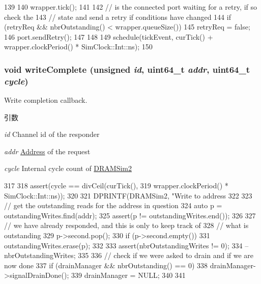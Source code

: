 \begin{DoxyCode}
139 {
140     wrapper.tick();
141 
142     // is the connected port waiting for a retry, if so check the
143     // state and send a retry if conditions have changed
144     if (retryReq && nbrOutstanding() < wrapper.queueSize()) {
145         retryReq = false;
146         port.sendRetry();
147     }
148 
149     schedule(tickEvent, curTick() + wrapper.clockPeriod() * SimClock::Int::ns);
150 }
\end{DoxyCode}
\hypertarget{classDRAMSim2_aeb50ab991dbcebefc4952362893d0891}{
\subsubsection[{writeComplete}]{\setlength{\rightskip}{0pt plus 5cm}void writeComplete (unsigned {\em id}, \/  uint64\_\-t {\em addr}, \/  uint64\_\-t {\em cycle})}}
\label{classDRAMSim2_aeb50ab991dbcebefc4952362893d0891}
Write completion callback.


\begin{DoxyParams}{引数}
\item[{\em id}]Channel id of the responder \item[{\em addr}]\hyperlink{classAddress}{Address} of the request \item[{\em cycle}]Internal cycle count of \hyperlink{classDRAMSim2}{DRAMSim2} \end{DoxyParams}



\begin{DoxyCode}
317 {
318     assert(cycle == divCeil(curTick(),
319                             wrapper.clockPeriod() * SimClock::Int::ns));
320 
321     DPRINTF(DRAMSim2, "Write to address %
322 
323     // get the outstanding reads for the address in question
324     auto p = outstandingWrites.find(addr);
325     assert(p != outstandingWrites.end());
326 
327     // we have already responded, and this is only to keep track of
328     // what is outstanding
329     p->second.pop();
330     if (p->second.empty())
331         outstandingWrites.erase(p);
332 
333     assert(nbrOutstandingWrites != 0);
334     --nbrOutstandingWrites;
335 
336     // check if we were asked to drain and if we are now done
337     if (drainManager && nbrOutstanding() == 0) {
338         drainManager->signalDrainDone();
339         drainManager = NULL;
340     }
341 }
\end{DoxyCode}



